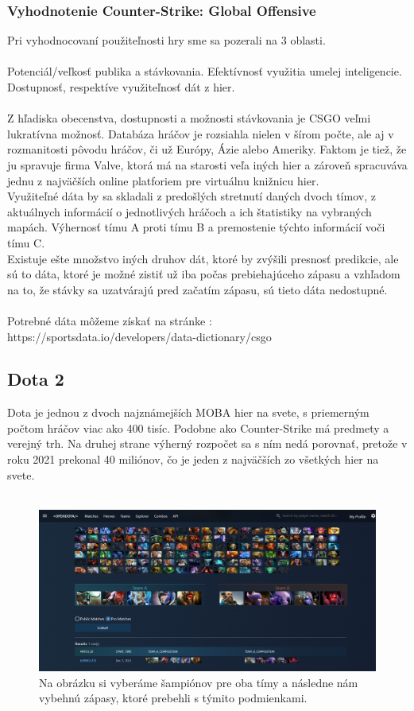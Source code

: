  

 \subsubsection{Vyhodnotenie Counter-Strike: Global Offensive}
 Pri vyhodnocovaní použiteľnosti hry sme sa pozerali na 3 oblasti. \\ \\ Potenciál/veľkosť publika a stávkovania. Efektívnosť využitia umelej inteligencie. Dostupnosť, respektíve využiteľnosť dát z hier. \\ \\
 Z hľadiska obecenstva, dostupnosti a možnosti stávkovania je CSGO veľmi lukratívna možnosť. Databáza hráčov je rozsiahla nielen v šírom počte, ale aj v rozmanitosti pôvodu hráčov, či už Európy, Ázie alebo Ameriky. Faktom je tiež, že ju spravuje firma Valve, ktorá má na starosti veľa iných hier a zároveň spracuváva jednu z najväčších online platforiem pre virtuálnu knižnicu hier. \\
 Využiteľné dáta by sa skladali z predošlých stretnutí daných dvoch tímov, z aktuálnych informácií o jednotlivých hráčoch a ich štatistiky na vybraných mapách. Výhernosť tímu A proti tímu B a premostenie týchto informácií voči tímu C.\\
 Existuje ešte množstvo iných druhov dát, ktoré by zvýšili presnosť predikcie, ale sú to dáta, ktoré je možné zistiť už iba počas prebiehajúceho zápasu a vzhľadom na to, že stávky sa uzatvárajú pred začatím zápasu, sú tieto dáta nedostupné.
 \\ \\
 Potrebné dáta môžeme získať na stránke :
 \\
 https://sportsdata.io/developers/data-dictionary/csgo


\subsection{Dota 2}
Dota je jednou z dvoch najznámejších MOBA hier na svete, s priemerným počtom hráčov viac ako 400 tisíc. \cite{dotaplayers} Podobne ako Counter-Strike má predmety a verejný trh. Na druhej strane výherný rozpočet sa s ním nedá porovnať, pretože v roku 2021 prekonal 40 miliónov, čo je jeden z najväčších zo všetkých hier na svete. \cite{dotaprizepool}
\\ \\
 \begin{figure}[h!]
	\includegraphics[width=.9\textwidth]{figures/dota1}
	\centering
	\caption{ Na obrázku si vyberáme šampiónov pre oba tímy a následne nám vybehnú zápasy, ktoré prebehli s týmito podmienkami. \label{dota1}}
	
\end{figure}


